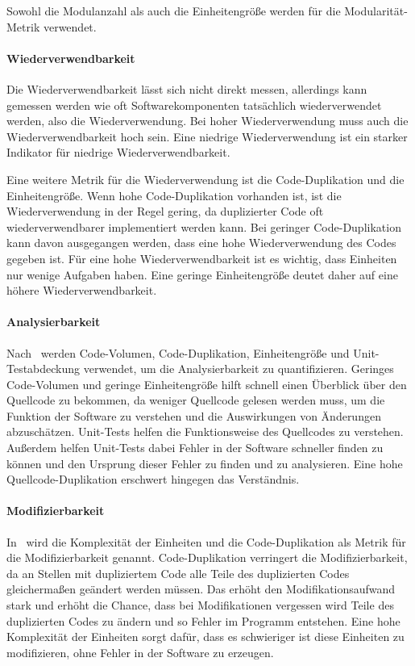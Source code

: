 \documentclass[12pt, a4paper, ngerman]{article}
\begin{document}
Sowohl die Modulanzahl als auch die Einheitengröße werden
für die Modularität-Metrik verwendet.

\paragraph{Wiederverwendbarkeit}

Die Wiederverwendbarkeit lässt sich nicht direkt messen,
allerdings kann gemessen werden wie oft Softwarekomponenten
tatsächlich wiederverwendet werden, also die Wiederverwendung.
Bei hoher Wiederverwendung muss auch die Wiederverwendbarkeit hoch sein.
Eine niedrige Wiederverwendung ist ein starker Indikator für niedrige Wiederverwendbarkeit.

Eine weitere Metrik für die Wiederverwendung ist die Code-Duplikation und die Einheitengröße.
Wenn hohe Code-Duplikation vorhanden ist, ist die Wiederverwendung in der Regel gering,
da duplizierter Code oft wiederverwendbarer implementiert werden kann.
Bei geringer Code-Duplikation kann davon ausgegangen werden,
dass eine hohe Wiederverwendung des Codes gegeben ist.
Für eine hohe Wiederverwendbarkeit ist es wichtig,
dass Einheiten nur wenige Aufgaben haben.
Eine geringe Einheitengröße deutet daher auf eine höhere Wiederverwendbarkeit.

\paragraph{Analysierbarkeit}

Nach~\cite{maintainability_metrics} werden Code-Volumen, Code-Duplikation, Einheitengröße
und Unit-Testabdeckung verwendet, um die Analysierbarkeit zu quantifizieren.
Geringes Code-Volumen und geringe Einheitengröße hilft
schnell einen Überblick über den Quellcode zu bekommen,
da weniger Quellcode gelesen werden muss, um die Funktion der Software zu verstehen
und die Auswirkungen von Änderungen abzuschätzen.
Unit-Tests helfen die Funktionsweise des Quellcodes zu verstehen.
Außerdem helfen Unit-Tests dabei Fehler in der Software schneller finden zu können
und den Ursprung dieser Fehler zu finden und zu analysieren.
Eine hohe Quellcode-Duplikation erschwert hingegen das Verständnis.

\paragraph{Modifizierbarkeit}

In~\cite{maintainability_metrics} wird die Komplexität der Einheiten und die Code-Duplikation
als Metrik für die Modifizierbarkeit genannt.
Code-Duplikation verringert die Modifizierbarkeit, da an Stellen mit dupliziertem Code
alle Teile des duplizierten Codes gleichermaßen geändert werden müssen.
Das erhöht den Modifikationsaufwand stark und erhöht die Chance,
dass bei Modifikationen vergessen wird Teile des duplizierten Codes zu ändern und so Fehler im Programm entstehen.
Eine hohe Komplexität der Einheiten sorgt dafür,
dass es schwieriger ist diese Einheiten zu modifizieren, ohne Fehler in der Software zu erzeugen.
\end{document}
